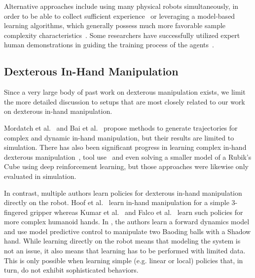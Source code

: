 Alternative approaches include using many physical robots simultaneously, in order to be able to collect sufficient experience~\citep{DBLP:conf/icra/GuHLL17, DBLP:journals/ijrr/LevinePKIQ18, 2018arXiv180610293K} or leveraging a model-based learning algorithms, which generally possess much more favorable sample complexity characteristics~\cite{DBLP:journals/corr/abs-1808-09105}. Some researchers have successfully  utilized expert human demonstrations in guiding the training process of the agents~\citep{DBLP:journals/corr/abs-1906-11695,DBLP:journals/corr/abs-1903-01973,DBLP:journals/corr/abs-1810-01845,DBLP:journals/corr/abs-1810-06045}.

\subsection{Dexterous In-Hand Manipulation}
Since a very large body of past work on dexterous manipulation exists, we limit the more detailed discussion to setups that are most closely related to our work on dexterous in-hand manipulation.

Mordatch et al.~\citep{DBLP:conf/sca/MordatchPT12} and Bai et al.~\citep{DBLP:conf/icra/BaiL14} propose methods to generate trajectories for complex and dynamic in-hand manipulation, but their results are limited to simulation.
There has also been significant progress in learning complex in-hand dexterous manipulation~\citep{plappert2018multi, DBLP:journals/corr/abs-1804-08617}, tool use~\citep{DBLP:journals/corr/abs-1709-10087} and even solving a smaller model of a Rubik's Cube \cite{2019arXiv190711388L} using deep reinforcement learning, but those approaches were likewise only evaluated in simulation.

In contrast, multiple authors learn policies for dexterous in-hand manipulation directly on the robot.
Hoof et al.~\citep{DBLP:conf/humanoids/HoofHN015} learn in-hand manipulation for a simple 3-fingered gripper whereas Kumar et al.~\citep{DBLP:conf/icra/KumarTL16, DBLP:journals/corr/KumarGTL16} and Falco et al.~\citep{falco2018policy} learn such policies for more complex humanoid hands. In \cite{PDDM}, the authors learn a forward dynamics model and use model predictive control to manipulate two Baoding balls with a Shadow hand.
While learning directly on the robot means that modeling the system is not an issue, it also means that learning has to be performed with limited data.
This is only possible when learning simple (e.g. linear or local) policies that, in turn, do not exhibit sophisticated behaviors.

